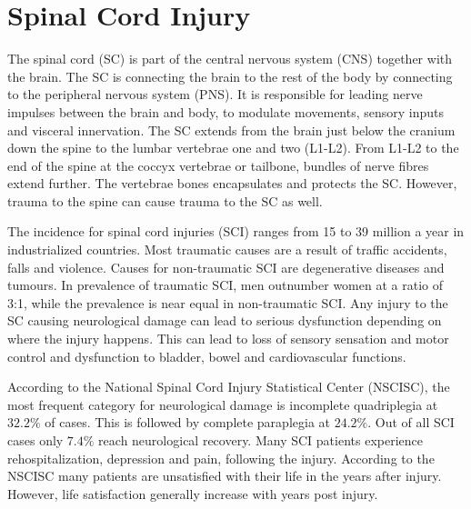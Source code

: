
\section{Spinal Cord Injury}

The spinal cord (SC) is part of the central nervous system (CNS) together with the brain. The SC is connecting the brain to the rest of the body by connecting to the peripheral nervous system (PNS). It is responsible for leading nerve impulses between the brain and body, to modulate movements, sensory inputs and visceral innervation. The SC extends from the brain just below the cranium down the spine to the lumbar vertebrae one and two (L1-L2). From L1-L2 to the end of the spine at the coccyx vertebrae or tailbone, bundles of nerve fibres extend further. The vertebrae bones encapsulates and protects the SC. However, trauma to the spine can cause trauma to the SC as well. \cite{Weidner2017}

The incidence for spinal cord injuries (SCI) ranges from 15 to 39 million a year in industrialized countries. Most traumatic causes are a result of traffic accidents, falls and violence. Causes for non-traumatic SCI are degenerative diseases and tumours. In prevalence of traumatic SCI, men outnumber women at a ratio of 3:1, while the prevalence is near equal in non-traumatic SCI. Any injury to the SC causing neurological damage can lead to serious dysfunction depending on where the injury happens. This can lead to loss of sensory sensation and motor control and dysfunction to bladder, bowel and cardiovascular functions. \cite{Weidner2017}

According to the National Spinal Cord Injury Statistical Center (NSCISC), the most frequent category for neurological damage is incomplete quadriplegia at $32.2\%$ of cases. This is followed by complete paraplegia at $24.2\%$. Out of all SCI cases only $7.4\%$ reach neurological recovery. \cite{NSCISC2017} %
Many SCI patients experience rehospitalization, depression and pain, following the injury. According to the NSCISC many patients are unsatisfied with their life in the years after injury. However, life satisfaction generally increase with years post injury. \cite{NSCISC2017}